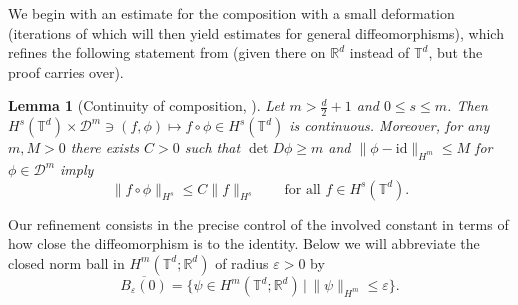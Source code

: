 \documentclass[a4paper, 12pt]{article}
\newtheorem{lemma}[theorem]{Lemma}
\newcommand{\R}{\mathbb{R}}
\newcommand{\T}{\mathbb{T}}
\newcommand{\id}{\mathrm{id}}
\newcommand{\DiffSob}{\mathcal D}
\begin{document}
We begin with an estimate for the composition with a small deformation (iterations of which will then yield estimates for general diffeomorphisms),
which refines the following statement from \cite{InKaTo13} (given there on $\R^d$ instead of $\T^d$, but the proof carries over).
\begin{lemma}[{Continuity of composition, \cite[Lemma 2.7]{InKaTo13}}]\label{thm:InKaTo13}
Let $m>\frac d2+1$ and $0\leq s\leq m$.
Then $H^s(\T^d)\times\DiffSob^m\ni(f,\phi)\mapsto f\circ\phi\in H^s(\T^d)$ is continuous.
Moreover, for any $m,M>0$ there exists $C>0$ such that $\det D\phi\geq m$ and $\|\phi-\id\|_{H^m}\leq M$ for $\phi\in\DiffSob^m$ imply
\begin{equation*}
\|f\circ\phi\|_{H^s}\leq C\|f\|_{H^s}
\qquad\text{for all }
f\in H^s(\T^d).
\end{equation*}
\end{lemma}
Our refinement consists in the precise control of the involved constant in terms of how close the diffeomorphism is to the identity.
Below we will abbreviate the closed norm ball in $H^m(\T^d;\R^d)$ of radius $\varepsilon>0$ by
\begin{equation*}
\overline{B_\varepsilon(0)}=\{\psi\in H^m(\T^d;\R^d)\,|\,\|\psi\|_{H^m}\leq\varepsilon\}.
\end{equation*}
\end{document}

